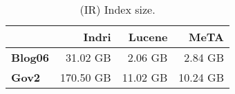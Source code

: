 \begin{table}[t]
\centering
{\small
\begin{tabular}{|l|r|r|r|}
    \hline & \textbf{Indri} & \textbf{Lucene} & \textbf{MeTA} \\
    \hline
    \textbf{Blog06} & 31.02 GB & 2.06 GB & 2.84 GB \\
    \textbf{Gov2} & 170.50 GB & 11.02 GB & 10.24 GB \\
    \hline
\end{tabular}
\caption{(IR) Index size.}
\label{table:ir-index-size}
}
\end{table}
